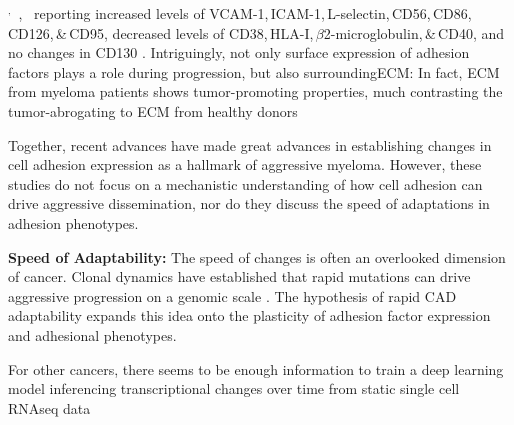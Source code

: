 $^,$\,%
,~%
reporting %
increased levels of VCAM-1,\,ICAM-1,\,L-selectin,\,CD56,\,CD86,\,CD126,\,\&\,CD95, %
decreased levels of CD38,\,HLA-I,\,$\beta$2-microglobulin,\,\&\,CD40, and %
no changes in CD130 %
\cite{terposIncreasedCirculatingVCAM12016, perez-andresClonalPlasmaCells2005}.
Intriguingly, not only surface expression of adhesion factors plays a role
during progression, but also surrounding\ac{ECM}: In fact, \ac{ECM} from myeloma
patients shows tumor-promoting properties, much contrasting the tumor-abrogating
to \ac{ECM} from healthy donors
\cite{ibraheemBMMSCsderivedECMModifies2019}

Together, recent advances have made great advances in establishing changes in
cell adhesion expression as a hallmark of aggressive myeloma. However, these
studies do not focus on a mechanistic understanding of how cell adhesion can
drive aggressive dissemination, nor do they discuss the speed of adaptations in
adhesion phenotypes.

\textbf{Speed of Adaptability:}
The speed of changes is often an overlooked dimension of cancer. Clonal dynamics
have established that rapid mutations can drive aggressive progression on a
genomic scale \citet{keatsClonalCompetitionAlternating2012}. The hypothesis
of rapid \ac{CAD} adaptability expands this idea onto the plasticity of adhesion factor expression and adhesional phenotypes.

For other cancers, there seems to be enough information to train a deep learning
model inferencing transcriptional changes over time from static single cell
RNAseq data
\cite{tongLearningTranscriptionalRegulatory2023}


